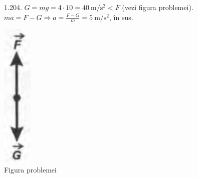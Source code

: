 1.204. $G=m g=4 \cdot 10=40 \mathrm{~m} / \mathrm{s}^{2}<F$ (vezi figura problemei).\\ $m a=F-G \Rightarrow a=\frac{F-G}{m}=5 \mathrm{~m} / \mathrm{s}^{2}$, în sus.\\ \begin{center} \includegraphics[width=0.4\linewidth]{images/2025_07_01_5b3ff9fa0d508c8e9f17g-242}\\ Figura problemei \end{center}\\

